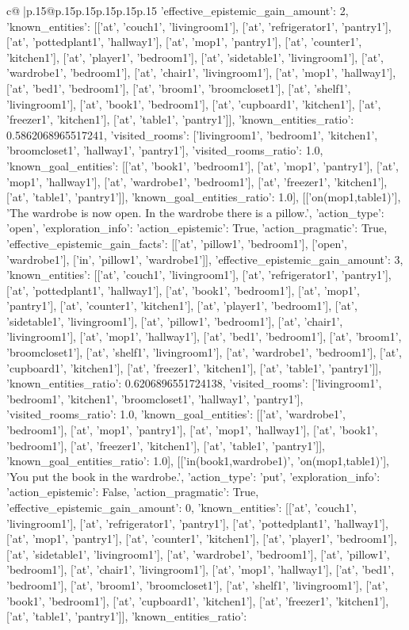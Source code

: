 \documentclass{article}
\begin{document}
{\begin{supertabular}{c@{$\;$}|p{.15\linewidth}@{}p{.15\linewidth}p{.15\linewidth}p{.15\linewidth}p{.15\linewidth}p{.15\linewidth}}
{{{'effective_epistemic_gain_amount': 2, 'known_entities': [['at', 'couch1', 'livingroom1'], ['at', 'refrigerator1', 'pantry1'], ['at', 'pottedplant1', 'hallway1'], ['at', 'mop1', 'pantry1'], ['at', 'counter1', 'kitchen1'], ['at', 'player1', 'bedroom1'], ['at', 'sidetable1', 'livingroom1'], ['at', 'wardrobe1', 'bedroom1'], ['at', 'chair1', 'livingroom1'], ['at', 'mop1', 'hallway1'], ['at', 'bed1', 'bedroom1'], ['at', 'broom1', 'broomcloset1'], ['at', 'shelf1', 'livingroom1'], ['at', 'book1', 'bedroom1'], ['at', 'cupboard1', 'kitchen1'], ['at', 'freezer1', 'kitchen1'], ['at', 'table1', 'pantry1']], 'known_entities_ratio': 0.5862068965517241, 'visited_rooms': ['livingroom1', 'bedroom1', 'kitchen1', 'broomcloset1', 'hallway1', 'pantry1'], 'visited_rooms_ratio': 1.0, 'known_goal_entities': [['at', 'book1', 'bedroom1'], ['at', 'mop1', 'pantry1'], ['at', 'mop1', 'hallway1'], ['at', 'wardrobe1', 'bedroom1'], ['at', 'freezer1', 'kitchen1'], ['at', 'table1', 'pantry1']], 'known_goal_entities_ratio': 1.0}}], [['on(mop1,table1)'], 'The wardrobe is now open. In the wardrobe there is a pillow.', {'action_type': 'open', 'exploration_info': {'action_epistemic': True, 'action_pragmatic': True, 'effective_epistemic_gain_facts': [['at', 'pillow1', 'bedroom1'], ['open', 'wardrobe1'], ['in', 'pillow1', 'wardrobe1']], 'effective_epistemic_gain_amount': 3, 'known_entities': [['at', 'couch1', 'livingroom1'], ['at', 'refrigerator1', 'pantry1'], ['at', 'pottedplant1', 'hallway1'], ['at', 'book1', 'bedroom1'], ['at', 'mop1', 'pantry1'], ['at', 'counter1', 'kitchen1'], ['at', 'player1', 'bedroom1'], ['at', 'sidetable1', 'livingroom1'], ['at', 'pillow1', 'bedroom1'], ['at', 'chair1', 'livingroom1'], ['at', 'mop1', 'hallway1'], ['at', 'bed1', 'bedroom1'], ['at', 'broom1', 'broomcloset1'], ['at', 'shelf1', 'livingroom1'], ['at', 'wardrobe1', 'bedroom1'], ['at', 'cupboard1', 'kitchen1'], ['at', 'freezer1', 'kitchen1'], ['at', 'table1', 'pantry1']], 'known_entities_ratio': 0.6206896551724138, 'visited_rooms': ['livingroom1', 'bedroom1', 'kitchen1', 'broomcloset1', 'hallway1', 'pantry1'], 'visited_rooms_ratio': 1.0, 'known_goal_entities': [['at', 'wardrobe1', 'bedroom1'], ['at', 'mop1', 'pantry1'], ['at', 'mop1', 'hallway1'], ['at', 'book1', 'bedroom1'], ['at', 'freezer1', 'kitchen1'], ['at', 'table1', 'pantry1']], 'known_goal_entities_ratio': 1.0}}], [['in(book1,wardrobe1)', 'on(mop1,table1)'], 'You put the book in the wardrobe.', {'action_type': 'put', 'exploration_info': {'action_epistemic': False, 'action_pragmatic': True, 'effective_epistemic_gain_amount': 0, 'known_entities': [['at', 'couch1', 'livingroom1'], ['at', 'refrigerator1', 'pantry1'], ['at', 'pottedplant1', 'hallway1'], ['at', 'mop1', 'pantry1'], ['at', 'counter1', 'kitchen1'], ['at', 'player1', 'bedroom1'], ['at', 'sidetable1', 'livingroom1'], ['at', 'wardrobe1', 'bedroom1'], ['at', 'pillow1', 'bedroom1'], ['at', 'chair1', 'livingroom1'], ['at', 'mop1', 'hallway1'], ['at', 'bed1', 'bedroom1'], ['at', 'broom1', 'broomcloset1'], ['at', 'shelf1', 'livingroom1'], ['at', 'book1', 'bedroom1'], ['at', 'cupboard1', 'kitchen1'], ['at', 'freezer1', 'kitchen1'], ['at', 'table1', 'pantry1']], 'known_entities_ratio': }}}
\end{supertabular}}
\end{document}
